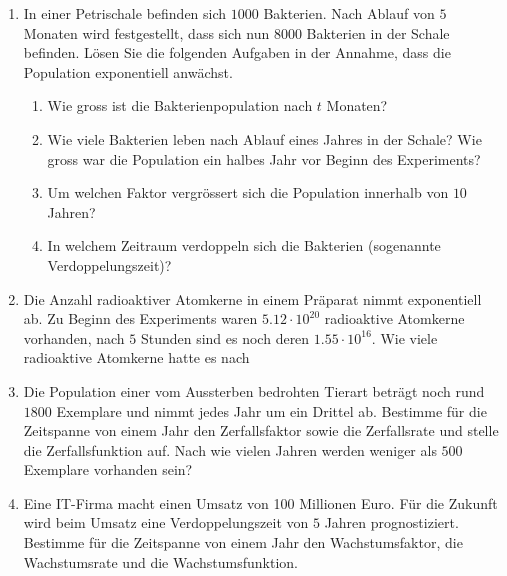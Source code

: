 \documentclass[11pt,oneside]{article}
\begin{document}
\begin{aufgabe}
\begin{enumerate}
\begin{table}[H]
			\end{table}
			\begin{table}[H]
				\centering
				\begin{tabular}{c|p{8mm}|p{8mm}|p{8mm}|p{8mm}|p{8mm}|p{8mm}|p{8mm}|p{8mm}}
					$t$ & $0$ & $1$ & $2$ & $3$ & $4$ & $5$ & $6$ & $t$ \\\hline
					$k(t)$ & & & $2$ & & $18$ & $54$ & &
				\end{tabular}
			\end{table}
			\item In einer Petrischale befinden sich $1000$ Bakterien.  Nach Ablauf von $5$ Monaten wird festgestellt, dass sich nun $8000$ Bakterien in der Schale befinden. Lösen Sie die folgenden Aufgaben in der Annahme, dass die Population exponentiell anwächst.
			\begin{enumerate}[label=\alph*)]
				\item Wie gross ist die Bakterienpopulation nach $t$ Monaten?
				\item Wie viele Bakterien leben nach Ablauf eines Jahres in der Schale? Wie gross war die Population ein halbes Jahr vor Beginn des Experiments?
				\item Um welchen Faktor vergrössert sich die Population innerhalb von $10$ Jahren?
				\item In welchem Zeitraum verdoppeln sich die Bakterien (sogenannte Verdoppelungszeit)?
			\end{enumerate}
			\item 	Die Anzahl radioaktiver Atomkerne in einem Präparat nimmt exponentiell ab. Zu Beginn des Experiments waren $5.12\cdot 10^{20}$ radioaktive Atomkerne vorhanden, nach $5$ Stunden sind es noch deren $1.55\cdot 10^{16}$. Wie viele radioaktive Atomkerne hatte es nach
			\item Die Population einer vom Aussterben bedrohten Tierart beträgt noch rund $1800$ Exemplare und nimmt jedes Jahr um ein Drittel ab. Bestimme für die Zeitspanne von einem Jahr den Zerfallsfaktor sowie die Zerfallsrate und stelle die Zerfallsfunktion auf. Nach wie vielen Jahren werden weniger als $500$ Exemplare vorhanden sein?
			\item Eine IT-Firma macht einen Umsatz von 100 Millionen Euro. Für die Zukunft wird beim Umsatz eine Verdoppelungszeit von $5$ Jahren prognostiziert. Bestimme für die Zeitspanne von einem Jahr den Wachstumsfaktor, die Wachstumsrate und die Wachstumsfunktion.

\end{enumerate}
\end{aufgabe}
\end{document}
